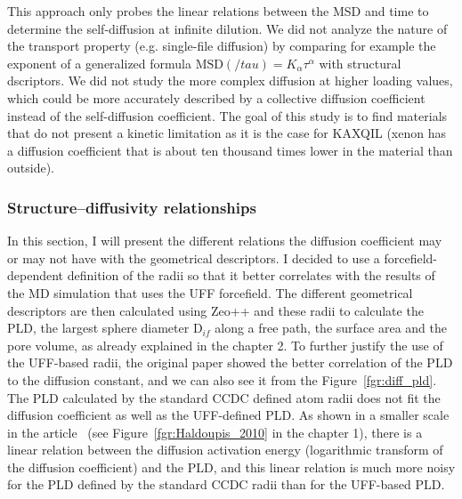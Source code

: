\documentclass[main]{subfiles}
\begin{document}
This approach only probes the linear relations between the MSD and time to determine the self-diffusion at infinite dilution. We did not analyze the nature of the transport property (e.g. single-file diffusion\autocite{Lin_2005}) by comparing for example the exponent of a generalized formula $\text{MSD}(/tau) = K_\alpha\tau^\alpha$ with structural dscriptors. We did not study the more complex diffusion at higher loading values, which could be more accurately described by a collective diffusion coefficient instead of the self-diffusion coefficient. The goal of this study is to find materials that do not present a kinetic limitation as it is the case for KAXQIL\autocite{Banerjee2012} (xenon has a diffusion coefficient that is about ten thousand times lower in the material than outside).

\subsubsection{Structure--diffusivity relationships}

In this section, I will present the different relations the diffusion coefficient may or may not have with the geometrical descriptors. I decided to use a forcefield-dependent definition of the radii so that it better correlates with the results of the MD simulation that uses the UFF forcefield. The different geometrical descriptors are then calculated using Zeo++ and these radii to calculate the PLD, the largest sphere diameter D$_{if}$ along a free path, the surface area and the pore volume, as already explained in the chapter 2. To further justify the use of the UFF-based radii, the original paper \cite{Hung_2021} showed the better correlation of the PLD to the diffusion constant, and we can also see it from the Figure~\ref{fgr:diff_pld}. The PLD calculated by the standard CCDC defined atom radii does not fit the diffusion coefficient as well as the UFF-defined PLD. As shown in a smaller scale in the article~\cite{Haldoupis_2010} (see Figure~\ref{fgr:Haldoupis_2010} in the chapter 1), there is a linear relation between the diffusion activation energy (logarithmic transform of the diffusion coefficient) and the PLD, and this linear relation is much more noisy for the PLD defined by the standard CCDC radii than for the UFF-based PLD.
\end{document}
